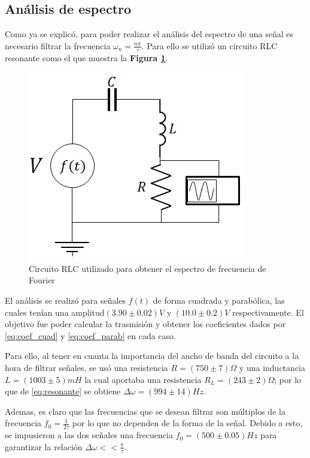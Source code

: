 \documentclass[11pt,a4paper]{article}
\begin{document}
\subsection{Análisis de espectro}

Como ya se explicó, para poder realizar el análisis del espectro de una señal es necesario filtrar la frecuencia $\omega_n = \frac{n \pi}{\tau}$. Para ello se utilizó un circuito RLC resonante como el que muestra la \textbf{Figura \ref{fig:RLC-espectro}}.

\begin{figure}[h]
\centering
\includegraphics[scale=.7]{RLC-espectro}
\caption{Circuito RLC utilizado para obtener el espectro de frecuencia de Fourier}
\label{fig:RLC-espectro}
\end{figure}

El análisis se realizó para señales $f(t)$  de forma cuadrada y parabólica, las cuales tenían una amplitud$(3.90 \pm 0.02)V$ y $(10.0 \pm 0.2)V$ respectivamente. El objetivo fue poder calcular la trasmisión y obtener los coeficientes dados por \eqref{eq:coef_cuad} y \eqref{eq:coef_parab} en cada caso.

Para ello, al tener en cuanta la importancia del ancho de banda del circuito a la hora de filtrar señales, se usó una resistencia $R=(750 \pm 7)\Omega$ y una inductancia $L=(1003 \pm 5)mH$ la cual aportaba una resistencia $R_L = (243 \pm 2)\Omega$; por lo que de \eqref{eq:resonante} se obtiene $\Delta \omega = (994 \pm 14)Hz$.

Ademas, es claro que las frecuencias que se desean filtrar son múltiplos de la frecuencia $f_0 = \frac{1}{2\tau}$ por lo que no dependen de la forma de la señal. Debido a esto, se impusieron a las dos señales una frecuencia $f_0 = (500 \pm 0.05) Hz$ para garantizar la relación $\Delta\omega << \frac{\pi}{\tau}$.
\end{document}
